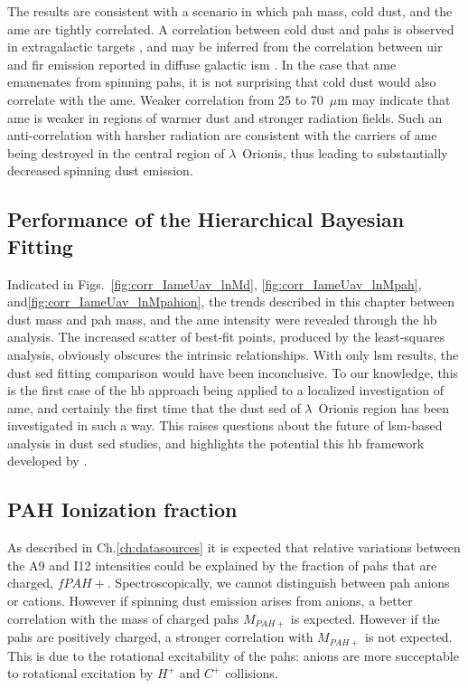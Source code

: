         The results are consistent with a scenario in which \gls{pah} mass, cold dust, and the \gls{ame} are tightly correlated. A correlation between cold dust and \gls{pah}s is observed in extragalactic targets \citep{haas02}, and may be inferred from the correlation between \gls{uir} and \gls{fir} emission reported in diffuse galactic \gls{ism} \citep{onaka96}. In the case that \gls{ame} emanenates from spinning \gls{pah}s, it is not surprising that cold dust would also correlate with the \gls{ame}. Weaker correlation from 25 to 70~$\mu$m may indicate that \gls{ame} is weaker in regions of warmer dust and stronger radiation fields. Such an anti-correlation with harsher radiation are consistent with the carriers of \gls{ame} being destroyed in the central region of $\lambda$~Orionis, thus leading to substantially decreased spinning dust emission.

      \subsection{Performance of the Hierarchical Bayesian Fitting}


      Indicated in Figs.~\ref{fig:corr_IameUav_lnMd}, \ref{fig:corr_IameUav_lnMpah}, and\ref{fig:corr_IameUav_lnMpahion}, the trends described in this chapter between dust mass and \gls{pah} mass, and the \gls{ame} intensity were revealed through the \gls{hb} analysis. The increased scatter of best-fit points, produced by the least-squares analysis, obviously obscures the intrinsic relationships. With only \gls{lsm} results, the dust \gls{sed} fitting comparison would have been inconclusive. To our knowledge, this is the first case of the \gls{hb} approach being applied to a localized investigation of \gls{ame}, and certainly the first time that the dust \gls{sed} of $\lambda$~Orionis region has been investigated in such a way. This raises questions about the future of \gls{lsm}-based analysis in dust \gls{sed} studies, and highlights the potential this \gls{hb} framework developed by \cite{galliano18}.


      \subsection{PAH Ionization fraction}
          As described in Ch.\ref{ch:datasources} it is expected that relative variations between the A9 and I12 intensities could be explained by the fraction of \gls{pah}s that are charged, $fPAH+$. Spectroscopically, we cannot distinguish between \gls{pah} anions or cations. However if spinning dust emission arises from anions, a better correlation with the mass of charged \gls{pah}s $M_{PAH+}$ is expected. However if the \gls{pah}s are positively charged, a stronger correlation with $M_{PAH+}$ is not expected. This is due to the rotational excitability of the \gls{pah}s: anions are more succeptable to rotational excitation by $H^{+}$ and $C^{+}$ collisions\citep{ali-haimoud10}.

